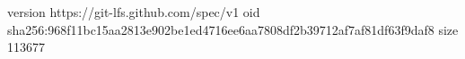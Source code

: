 version https://git-lfs.github.com/spec/v1
oid sha256:968f11bc15aa2813e902be1ed4716ee6aa7808df2b39712af7af81df63f9daf8
size 113677
